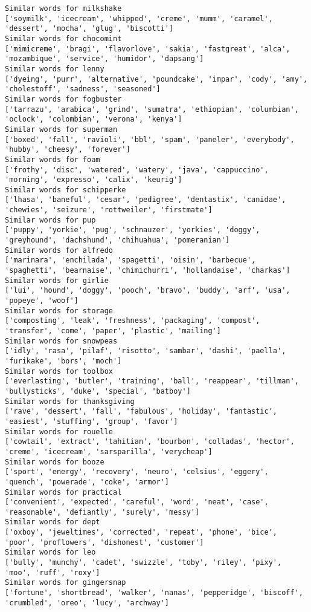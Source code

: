 \documentclass[11pt]{article}
\begin{document}
\begin{Verbatim}[commandchars=\\\{\}]
Similar words for milkshake
['soymilk', 'icecream', 'whipped', 'creme', 'mumm', 'caramel', 'dessert', 'mocha', 'glug', 'biscotti']
Similar words for chocomint
['mimicreme', 'bragi', 'flavorlove', 'sakia', 'fastgreat', 'alca', 'mozambique', 'service', 'humidor', 'dapsang']
Similar words for lenny
['dyeing', 'purr', 'alternative', 'poundcake', 'impar', 'cody', 'amy', 'cholestoff', 'sadness', 'seasoned']
Similar words for fogbuster
['tarrazu', 'arabica', 'grind', 'sumatra', 'ethiopian', 'columbian', 'oclock', 'colombian', 'verona', 'kenya']
Similar words for superman
['boxed', 'fall', 'ravioli', 'bbl', 'spam', 'paneler', 'everybody', 'hubby', 'cheesy', 'forever']
Similar words for foam
['frothy', 'disc', 'watered', 'watery', 'java', 'cappuccino', 'morning', 'expresso', 'calix', 'keurig']
Similar words for schipperke
['lhasa', 'baneful', 'cesar', 'pedigree', 'dentastix', 'canidae', 'chewies', 'seizure', 'rottweiler', 'firstmate']
Similar words for pup
['puppy', 'yorkie', 'pug', 'schnauzer', 'yorkies', 'doggy', 'greyhound', 'dachshund', 'chihuahua', 'pomeranian']
Similar words for alfredo
['marinara', 'enchilada', 'spagetti', 'oisin', 'barbecue', 'spaghetti', 'bearnaise', 'chimichurri', 'hollandaise', 'charkas']
Similar words for girlie
['lui', 'hound', 'doggy', 'pooch', 'bravo', 'buddy', 'arf', 'usa', 'popeye', 'woof']
Similar words for storage
['composting', 'leak', 'freshness', 'packaging', 'compost', 'transfer', 'come', 'paper', 'plastic', 'mailing']
Similar words for snowpeas
['idly', 'rasa', 'pilaf', 'risotto', 'sambar', 'dashi', 'paella', 'furikake', 'bors', 'moch']
Similar words for toolbox
['everlasting', 'butler', 'training', 'ball', 'reappear', 'tillman', 'bullysticks', 'duke', 'special', 'batboy']
Similar words for thanksgiving
['rave', 'dessert', 'fall', 'fabulous', 'holiday', 'fantastic', 'easiest', 'stuffing', 'group', 'favor']
Similar words for rouelle
['cowtail', 'extract', 'tahitian', 'bourbon', 'colladas', 'hector', 'creme', 'icecream', 'sarsparilla', 'verycheap']
Similar words for booze
['sport', 'energy', 'recovery', 'neuro', 'celsius', 'eggery', 'quench', 'powerade', 'coke', 'armor']
Similar words for practical
['convenient', 'expected', 'careful', 'word', 'neat', 'case', 'reasonable', 'defiantly', 'surely', 'messy']
Similar words for dept
['oxboy', 'jeweltimes', 'corrected', 'repeat', 'phone', 'bice', 'poor', 'proflowers', 'dishonest', 'customer']
Similar words for leo
['bully', 'munchy', 'cadet', 'swizzle', 'toby', 'riley', 'pixy', 'moo', 'ruff', 'roxy']
Similar words for gingersnap
['fortune', 'shortbread', 'walker', 'nanas', 'pepperidge', 'biscoff', 'crumbled', 'oreo', 'lucy', 'archway']

\end{Verbatim}
\end{document}
